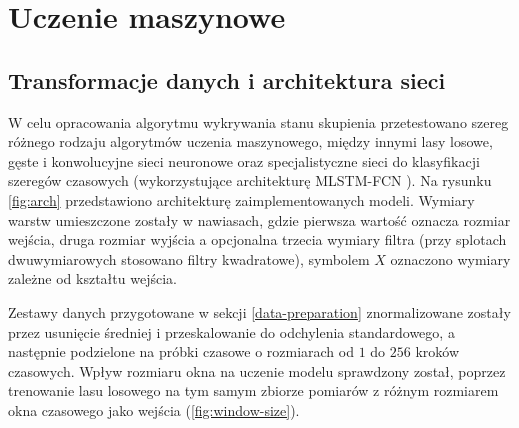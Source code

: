 \documentclass{./assets/wfis}
\begin{document}
\section{Uczenie maszynowe}\label{uczenie-maszynowe}
\subsection{Transformacje danych i architektura sieci}
W celu opracowania algorytmu wykrywania stanu skupienia przetestowano szereg różnego rodzaju algorytmów uczenia maszynowego, między innymi lasy losowe, gęste i konwolucyjne sieci neuronowe oraz specjalistyczne sieci do klasyfikacji szeregów czasowych (wykorzystujące architekturę MLSTM-FCN \cite{karim_multivariate_2019}). Na rysunku \ref{fig:arch} przedstawiono architekturę zaimplementowanych modeli. Wymiary warstw umieszczone zostały w nawiasach, gdzie pierwsza wartość oznacza rozmiar wejścia, druga rozmiar wyjścia a opcjonalna trzecia wymiary filtra (przy splotach dwuwymiarowych stosowano filtry kwadratowe), symbolem $X$ oznaczono wymiary zależne od kształtu wejścia.

Zestawy danych przygotowane w sekcji \ref{data-preparation} znormalizowane zostały przez usunięcie średniej i przeskalowanie do odchylenia standardowego, a następnie podzielone na próbki czasowe o rozmiarach od $1$ do $256$ kroków czasowych. Wpływ rozmiaru okna na uczenie modelu sprawdzony został, poprzez trenowanie lasu losowego na tym samym zbiorze pomiarów z różnym rozmiarem okna czasowego jako wejścia (\autoref{fig:window-size}).
\end{document}
